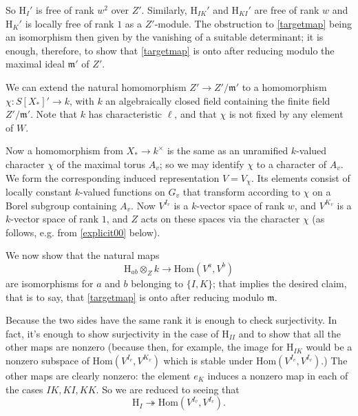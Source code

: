 \documentclass[10pt]{amsart}
\newcommand{\locally}{}
\newcommand{\Hom}{\mathrm{Hom}}
\theoremstyle{remark}
\begin{document}
 So $\mathrm{H}_I'$ is \locally free of rank $w^2$ over $Z'$.
Similarly, $\mathrm{H}_{IK}'$ and $\mathrm{H}_{KI}'$ are \locally free of rank $w$
and  $\mathrm{H}_K'$ is  locally free of rank $1$ as a $Z'$-module.  The
obstruction to \eqref{targetmap} being an isomorphism then given   by the vanishing of a suitable determinant;
it is enough, therefore, to  show that
\eqref{targetmap} is onto after reducing modulo the  maximal ideal $\mathfrak{m}'$ of $Z'$.
  

We can extend
%
%
the natural homomorphism $Z' \rightarrow Z'/\mathfrak{m}'$
to a homomorphism $\chi: S[X_*]' \rightarrow k$, 
  with $k$ an algebraically closed field containing the finite field $Z'/\mathfrak{m}'$. 
   Note that $k$ has characteristic $\ell$, and that $\chi$ is not fixed by any element of $W$.
      

Now  a homomorphism from $X_* \rightarrow k^{\times}$
is the same as
an unramified $k$-valued character $\chi$ of the maximal torus $A_v$;
so we may identify $\chi$ to a character of $A_v$. 
We form the corresponding induced representation $V= V_{\chi}$. 
Its elements consist of locally constant $k$-valued functions on $G_{v}$
that transform according to $\chi$ on a Borel subgroup containing $A_v$. 
Now
$V^{I_v}$ is a $k$-vector space of rank $w$, and $V^{K_v}$ is a $k$-vector space of rank $1$,
and $Z$ acts on these spaces via the character $\chi$ (as follows, e.g.
from \eqref{explicit00} below).   

We now show that the natural maps
$$\mathrm{H}_{ab} \otimes_Z  k \rightarrow \Hom(V^a, V^b)$$
are isomorphisms for $a$ and $b$ belonging to $\{I, K\}$; that implies the 
desired claim, that is to say, that \eqref{targetmap} is onto after reducing modulo $\mathfrak{m}$.

Because the two sides have the same rank it is enough to check surjectivity. 
In fact, it's enough to show surjectivity in the case of 
$\mathrm{H}_{II}$ and to show that all the other maps are nonzero (because then, for example, the image for $\mathrm{H}_{IK}$ would be a nonzero subspace
of $\Hom(V^{I_v}, V^{K_v})$ which is stable under $\Hom(V^{I_v}, V^{I_v})$.) 
 The other maps are clearly nonzero: the element $e_K$ induces a nonzero map
in each of the cases $IK, KI, KK$. So we are reduced to seeing that 
\begin{equation} \label{moo} \mathrm{H}_{I} \twoheadrightarrow \Hom(V^{I_v}, V^{I_v}).\end{equation}
\end{document}
